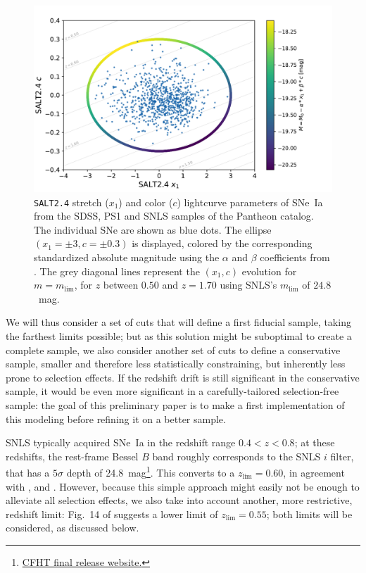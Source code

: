 \documentclass[]{aa}
\newcommand{\nn}[1]{\textcolor[rgb]{0.4, 0.8, 0}{#1}}
\begin{document}
\begin{figure}
    \centering
    \includegraphics[width=0.95\linewidth]{Article_figures/zmax_maglim_snls.pdf}
    \caption{\textsc{\texttt{SALT2.4}} stretch ($x_1$) and color ($c$)
        lightcurve parameters of SNe~Ia from the SDSS, PS1 and SNLS samples of
        the Pantheon catalog. The individual SNe are shown as blue dots. The
        ellipse $(x_1=\pm3, c=\pm0.3)$ is displayed, colored by the
        corresponding standardized absolute magnitude using the $\alpha$ and
        $\beta$ coefficients from \cite{scolnic2018a}. The grey diagonal lines
        represent the $(x_1, c)$ evolution for $m = m_{\lim}$, for $z$ between
        $0.50$ and $z=1.70$ using SNLS's $m_{\lim}$ of $24.8$~mag.}
    \label{fig:maglim}
\end{figure}

\nn{We will thus consider a set of cuts that will define a first fiducial
    sample, taking the farthest limits possible; but as this solution might be
    suboptimal to create a complete sample, we also consider another set of cuts
    to define a conservative sample, smaller and therefore less statistically
    constraining, but inherently less prone to selection effects. If the
    redshift drift is still significant in the conservative sample, it would be
    even more significant in a carefully-tailored selection-free sample: the
goal of this preliminary paper is to make a first implementation of this
modeling before refining it on a better sample.}

SNLS typically acquired SNe~Ia in the redshift range $0.4<z<0.8$; at these
redshifts, the rest-frame Bessel $B$ band roughly corresponds to the SNLS $i$
filter, that has a $5\sigma$ depth of
24.8~mag\footnote{\href{https://www.cfht.hawaii.edu/Science/CFHTLS/cfhtlsfinalreleaseexecsummary.html}{CFHT
final release website.}}. This converts to a $z_{\lim}=0.60$, in agreement
with \cite{neill2006}, \cite{perrett2010} and \cite{bazin2011}. \nn{However,
because this simple approach might easily not be enough to alleviate all
selection effects, we also take into account another, more restrictive,
redshift limit:} Fig.~14 of \citet[][see their Section~5]{perrett2010} suggests a
lower limit of $z_{\lim}=0.55$; both limits will be considered, as discussed
below.
\end{document}
